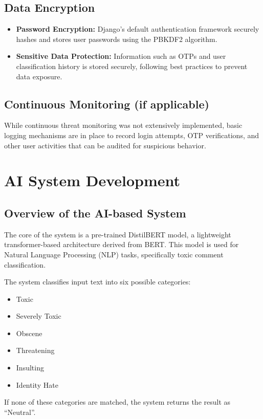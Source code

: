 \documentclass[a4paper,12pt]{article}
\begin{document}
\subsection{Data Encryption}
\begin{itemize}
    \item \textbf{Password Encryption:} Django’s default authentication framework securely hashes and stores user passwords using the PBKDF2 algorithm.
    \item \textbf{Sensitive Data Protection:} Information such as OTPs and user classification history is stored securely, following best practices to prevent data exposure.
\end{itemize}

\subsection{Continuous Monitoring (if applicable)}
While continuous threat monitoring was not extensively implemented, basic logging mechanisms are in place to record login attempts, OTP verifications, and other user activities that can be audited for suspicious behavior.

\section{AI System Development}

\subsection{Overview of the AI-based System}
The core of the system is a pre-trained DistilBERT model, a lightweight transformer-based architecture derived from BERT. This model is used for Natural Language Processing (NLP) tasks, specifically toxic comment classification.

The system classifies input text into six possible categories:

\begin{itemize}
    \item Toxic
    \item Severely Toxic
    \item Obscene
    \item Threatening
    \item Insulting
    \item Identity Hate
\end{itemize}

If none of these categories are matched, the system returns the result as ``Neutral''.
\end{document}
